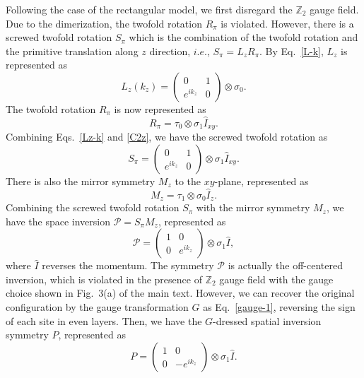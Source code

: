 \documentclass[aps,prl,twocolumn,noshowpacs,superscriptaddress]{revtex4-1}
\def \Z {\mathbb{Z}}
\begin{document}
Following the case of the rectangular model, we first disregard the $ \Z_2 $ gauge field. Due to the dimerization, the twofold rotation $ R_{\pi} $ is violated. However, there is a screwed twofold rotation $ S_{\pi} $ which is the combination of the twofold rotation and the primitive translation along $ z $ direction, $ i.e. $, $ S_{\pi}=L_zR_{\pi} $. By Eq.~\eqref{L-k}, $ L_z $ is represented as
\begin{equation}\label{Lz-k}
	L_z(k_z)=\begin{pmatrix}
		0 & 1 \\ e^{ik_z} & 0
	\end{pmatrix}\otimes \sigma_0.
\end{equation}
The twofold rotation $ R_{\pi} $ is now represented as
\begin{equation}\label{C2z}
	R_{\pi}=\tau_0\otimes\sigma_1\hat{I}_{xy}.
\end{equation}
Combining Eqs.~\eqref{Lz-k} and \eqref{C2z}, we have the screwed twofold rotation as
\begin{equation}\label{S2z}
	S_{\pi}=\begin{pmatrix}
		0 & 1 \\ e^{ik_z} & 0
	\end{pmatrix}\otimes \sigma_1\hat{I}_{xy}.
\end{equation}
There is also the mirror symmetry $ M_z $ to the $ xy $-plane, represented as
\begin{equation}\label{Mz}
	M_z=\tau_1\otimes\sigma_0\hat{I}_z.
\end{equation}
Combining the screwed twofold rotation $ S_{\pi} $ with the mirror symmetry $ M_z $, we have the space inversion $ \mathcal{P}=S_{\pi}M_z $, represented as
\begin{equation}\label{P-2}
	\mathcal{P}=\begin{pmatrix}
		1 & 0 \\ 0 & e^{ik_z}
	\end{pmatrix}\otimes\sigma_1\hat{I},
\end{equation}
where $ \hat{I}$ reverses the momentum. The symmetry $ \mathcal{P} $ is actually the off-centered inversion, which is violated in the presence of $ \Z_2 $ gauge field with the gauge choice shown in Fig.~3(a) of the main text. However, we can recover the original configuration by the gauge transformation $ G $ as Eq.~\eqref{gauge-1}, reversing the sign of each site in even layers. Then, we have the $ G $-dressed spatial inversion symmetry $ P $, represented as
\begin{equation}
	P=\begin{pmatrix}
		1 & 0 \\ 0 & -e^{ik_z}
	\end{pmatrix}\otimes\sigma_1\hat{I}.
\end{equation}
\end{document}

